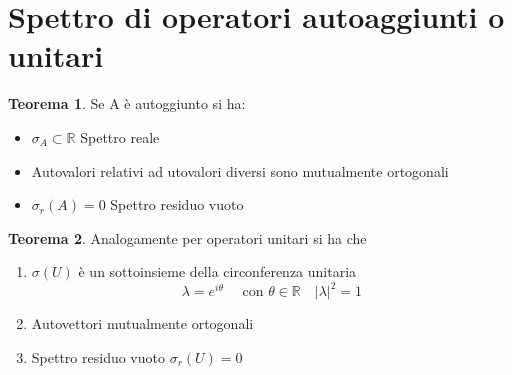 \documentclass[a4paper,11pt]{report}
\theoremstyle{remark}
\theoremstyle{definition}
\newtheorem*{teo}{Teorema}
\newcommand{\R}{\mathbb{R}}
\begin{document}
\section{Spettro di operatori autoaggiunti o unitari}
\begin{teo}
	Se A è autoggiunto si ha:
	\begin{itemize}
		\item $\sigma_A \subset \R$ Spettro reale
		\item Autovalori relativi ad utovalori diversi sono mutualmente ortogonali
		\item $\sigma_r(A) =0$ Spettro residuo vuoto
	\end{itemize}
\end{teo}
\begin{teo}
	Analogamente per operatori unitari si ha che 
	\begin{enumerate}
		\item $\sigma(U)$ è un sottoinsieme della circonferenza unitaria
		\begin{equation*}
			\lambda = e^{i\theta} \quad \text{ con } \theta \in \R \quad {|\lambda|}^2 = 1
		\end{equation*}
		\item Autovettori mutualmente ortogonali
		\item Spettro residuo vuoto $\sigma_r(U) = 0$
	\end{enumerate}
\end{teo}
\end{document}
